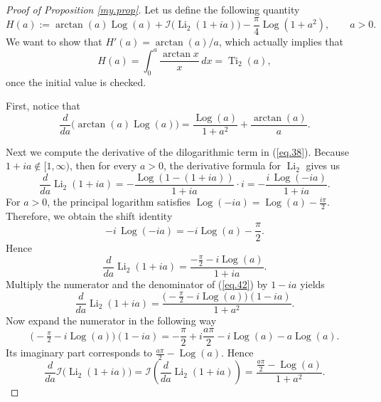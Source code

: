 \documentclass[10pt,a4paper]{amsart}
\begin{document}
\begin{proof}[Proof of Proposition \ref{my.prop}]\normalfont
Let us define the following quantity
\begin{equation}\label{eq.38}
H(a):=\arctan(a)\operatorname{Log}(a)
+
\mathscr{I}\!\bigl(\operatorname{Li}_2(1+ia)\bigr)
-\frac{\pi}{4}\operatorname{Log}(1+a^2),
\qquad a>0.
\end{equation}
We want to show that \(H'(a)=\arctan(a)/a\), which actually implies that
\begin{equation}
H(a)=\int_0^a \frac{\arctan x}{x}\,dx=\operatorname{Ti}_2(a),
\end{equation}
once the initial value is checked.

First, notice that
\begin{equation}\label{eq.40}
\frac{d}{da}\bigl(\arctan(a)\operatorname{Log}(a)\bigr)
=
\frac{\operatorname{Log}(a)}{1+a^2}+\frac{\arctan(a)}{a}.
\end{equation}

Next we compute the derivative of the dilogarithmic term in (\ref{eq.38}). Because \(1+ia\notin [1,\infty)\), then
for every \(a>0\), the derivative formula for \(\operatorname{Li}_2\) gives us
\begin{equation}
\frac{d}{da}\operatorname{Li}_2(1+ia)
=
-\frac{\operatorname{Log}(1-(1+ia))}{1+ia}\cdot i
=
-\frac{i\,\operatorname{Log}(-ia)}{1+ia}.
\end{equation}
For \(a>0\), the principal logarithm satisfies \(\operatorname{Log}(-ia)=\operatorname{Log}(a)-\frac{i\pi}{2}\). Therefore, we obtain the shift identity
\begin{equation}
-i\,\operatorname{Log}(-ia)
=
-i\operatorname{Log}(a)-\frac{\pi}{2}.
\end{equation}
Hence
\begin{equation}\label{eq.42}
\frac{d}{da}\operatorname{Li}_2(1+ia)
=
\frac{-\frac{\pi}{2}-i\operatorname{Log}(a)}{1+ia}.
\end{equation}
Multiply the numerator and the denominator of (\ref{eq.42}) by \(1-ia\) yields
\begin{equation}
\frac{d}{da}\operatorname{Li}_2(1+ia)
=
\frac{\bigl(-\frac{\pi}{2}-i\operatorname{Log}(a)\bigr)(1-ia)}{1+a^2}.
\end{equation}
Now expand the numerator in the following way
\begin{equation}\label{eq.44}
\bigl(-\tfrac{\pi}{2}-i\operatorname{Log}(a)\bigr)(1-ia)
=
-\frac{\pi}{2}
+
i\frac{a\pi}{2}
-
i\operatorname{Log}(a)
-
a\operatorname{Log}(a).
\end{equation}
Its imaginary part corresponds to \(\frac{a\pi}{2}-\operatorname{Log}(a)\).
Hence
\begin{equation}\label{eq.46}
\frac{d}{da}\mathscr{I}\!\bigl(\operatorname{Li}_2(1+ia)\bigr)
=
\mathscr{I}\!\left(\frac{d}{da}\operatorname{Li}_2(1+ia)\right)
=
\frac{\frac{a\pi}{2}-\operatorname{Log}(a)}{1+a^2}.
\end{equation}


\end{proof}
\end{document}
